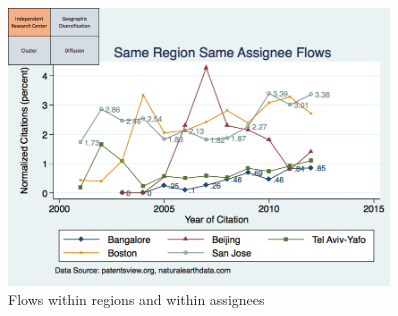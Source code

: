 \documentclass[10pt,letterpaper]{article}
\begin{document}
\\\\
\begin{figure}[h!]
\begin{centering}
  \includegraphics[width=0.90\textwidth]{SMSSameRegionSameAssigneeFlows}
  \caption{Flows within regions and within assignees}
  \label{fig:SMSSameRegionSameAssigneeFlows}
\end{centering}
\end{figure}
\end{document}
